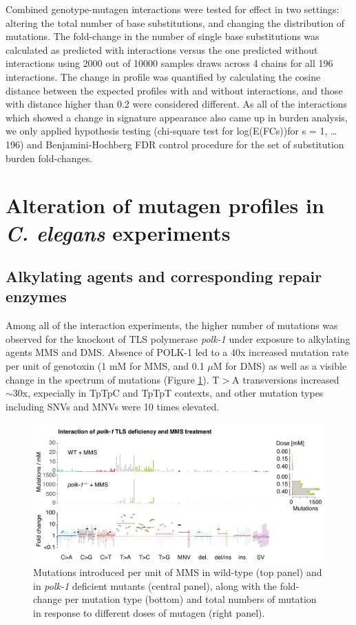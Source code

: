 Combined genotype-mutagen interactions were tested for effect in two settings: altering the total number of base substitutions, and changing the distribution of mutations. The fold-change in the number of single base substitutions was calculated as predicted with interactions versus the one predicted without interactions using 2000 out of 10000 samples draws across 4 chains for all 196 interactions. The change in profile was quantified by calculating the cosine distance between the expected profiles with and without interactions, and those with distance higher than 0.2 were considered different. As all of the interactions which showed a change in signature appearance also came up in burden analysis, we only applied hypothesis testing (chi-square test for log(E(FCs))for s = 1, … 196) and Benjamini-Hochberg FDR control procedure for the set of substitution burden fold-changes.


\section{Alteration of mutagen profiles in \textit{C. elegans} experiments}

\subsection{Alkylating agents and corresponding repair enzymes}

Among all of the interaction experiments, the higher number of mutations was observed for the knockout of TLS polymerase \textit{polk-1} under exposure to alkylating agents MMS and DMS. Absence of POLK-1 led to a 40x increased mutation rate per unit of genotoxin (1 mM for MMS, and 0.1 $\mu$M for DMS) as well as a visible change in the spectrum of mutations (Figure \ref{polk1mms}). T$>$A transversions increased $\sim 30$x, expecially in TpTpC and TpTpT contexts, and other mutation types including SNVs and MNVs were 10 times elevated. 

\begin{figure}[h]
  \centering
\centerline{\includegraphics[width=1\textwidth]{figures/polk-1-MMS-interaction.png}}
  \caption{Mutations introduced per unit of MMS in wild-type (top panel) and in \textit{polk-1} deficient mutants (central panel), along with the fold-change per mutation type (bottom) and total numbers of mutation in response to different doses of mutagen (right panel).}
  \label{polk1mms}
\end{figure}


